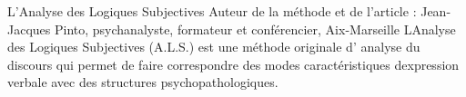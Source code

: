 L’\+Analyse des Logiques Subjectives Auteur de la méthode et de l’article \+: Jean-\/\+Jacques Pinto, psychanalyste, formateur et conférencier, Aix-\/\+Marseille L\textquotesingle{}Analyse des Logiques Subjectives (A.\+L.\+S.) est une méthode originale d’ analyse du discours qui permet de faire correspondre des modes caractéristiques d\textquotesingle{}expression verbale avec des structures psychopathologiques. 